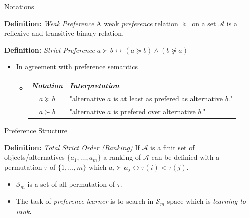 \documentclass[]{beamer}
\newcommand{\Cp}{\emph{Preference} }
\newcommand{\p}{\emph{preference} }
\renewcommand{\|}[1][.3em]{\hspace{#1}|\hspace{#1}}
\renewcommand{\,}[1][.3em]{,\hspace{#1}}
\begin{document}
\begin{frame}{Notations}
	\begin{block}{\textbf{Definition:} \textit{Weak} \Cp}
	A weak \p relation  $\succeq$ on a set $\mathcal{A}$ is a reflexive and transitive binary relation.
	\end{block}
	\pause
	\begin{block}{\textbf{Definition:} \textit{Strict} \Cp}\center
	$a \succ b  \longleftrightarrow  (a \succeq b) \wedge (b \nsucceq a)$
	\end{block}
	\pause
    \begin{itemize}
    \item In agreement with preference semantics
        \begin{itemize}
        \item[] \vspace{1em}
            \begin{table}
	            \centering
	            \begin{tabular}{c|l}
	                \textit{Notation} & \textit{Interpretation} \\\hline\rule{0pt}{1.6em}
	                $a \succeq b$ & "alternative $a$ is at least as prefered as alternative $b$." \\\rule{0pt}{1.6em}
	                $a \succ b$ & "alternative $a$ is prefered over alternative $b$."\\
	            \end{tabular}
	        \end{table}
        \end{itemize}
    \end{itemize}
\end{frame}

\begin{frame}{Preference Structure}
	\begin{block}{\textbf{Definition:} \textit{Total Strict Order (Ranking)}}\footnotesize
	If $\mathcal{A}$ is a finit set of objects/alternatives $\{a_1,\ldots,a_m\}$ a ranking of $\mathcal{A}$ can be definied with a permutation $\tau$ of $\{1,\ldots,m\}$ which {\small $a_i \succ a_j \leftrightarrow \tau(i) < \tau(j)$}.
	\end{block}
	\pause
    \begin{itemize}
    \item $\mathcal{S}_m$ is a set of all permutation of $\tau$.
    \item The task of \textit{preference learner} is to search in $\mathcal{S}_m$ space which is \emph{learning to rank}.
    \end{itemize}
\end{frame}
\end{document}
